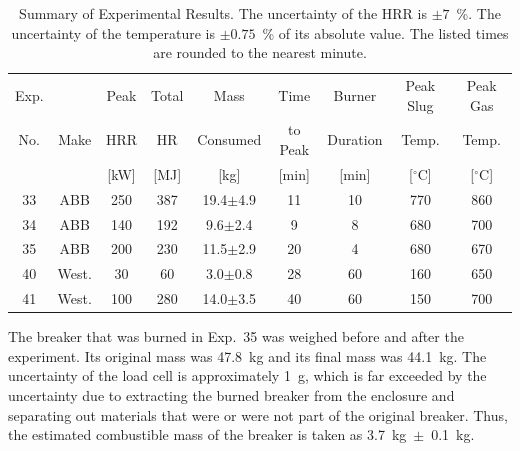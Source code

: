 \begin{table}[ht]
\begin{center}
\caption[Summary of Experimental Results]{Summary of Experimental Results. The uncertainty of the HRR is $\pm 7$~\%. The uncertainty of the temperature is $\pm 0.75$~\% of its absolute value. The listed times are rounded to the nearest minute.}
\label{matrix}
\begin{tabular}{|c|c|c|c|c|c|c|c|c|}
\hline
Exp.   &                & Peak          & Total   & Mass            & Time            & Burner       & Peak Slug    & Peak Gas      \\
No.    & Make           & HRR           & HR      & Consumed        & to Peak         & Duration     & Temp.        & Temp.         \\
       &                & [kW]          & [MJ]    & [kg]            & [min]           & [min]        & [$^\circ$C]  & [$^\circ$C]   \\ \hline
33     & ABB            & 250           & 387     & 19.4$\pm$4.9    & 11              & 10           & 770          & 860           \\ \hline
34     & ABB            & 140           & 192     & 9.6$\pm$2.4     & 9               & 8            & 680          & 700           \\ \hline
35     & ABB            & 200           & 230     & 11.5$\pm$2.9    & 20              & 4            & 680          & 670           \\ \hline
40     & West.          & 30            & 60      & 3.0$\pm$0.8     & 28              & 60           & 160          & 650           \\ \hline
41     & West.          & 100           & 280     & 14.0$\pm$3.5    & 40              & 60           & 150          & 700           \\ \hline
\end{tabular}
\end{center}
\end{table}

The breaker that was burned in Exp.~35 was weighed before and after the experiment. Its original mass was 47.8~kg and its final mass was 44.1~kg. The uncertainty of the load cell is approximately 1~g, which is far exceeded by the uncertainty due to extracting the burned breaker from the enclosure and separating out materials that were or were not part of the original breaker. Thus, the estimated combustible mass of the breaker is taken as 3.7~kg~$\pm$~0.1~kg.

